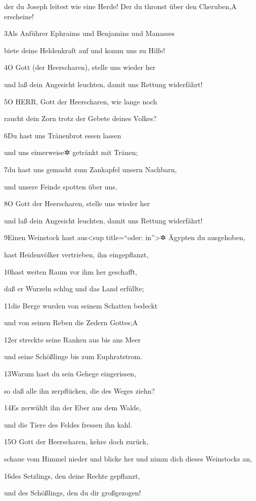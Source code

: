 der du Joseph leitest wie eine Herde! Der du thronst über den
Cheruben,{A} erscheine!

3Als Anführer Ephraims und Benjamins und Manasses

biete deine Heldenkraft auf und komm uns zu Hilfe!

4O Gott (der Heerscharen), stelle uns wieder her

und laß dein Angesicht leuchten, damit uns Rettung widerfährt!

5O HERR, Gott der Heerscharen, wie lange noch

raucht dein Zorn trotz der Gebete deines Volkes?

6Du hast uns Tränenbrot essen lassen

und uns eimerweise✲ getränkt mit Tränen;

7du hast uns gemacht zum Zankapfel unsern Nachbarn,

und unsere Feinde spotten über uns.

8O Gott der Heerscharen, stelle uns wieder her

und laß dein Angesicht leuchten, damit uns Rettung widerfährt!

9Einen Weinstock hast aus\textless sup title=``oder: in''\textgreater✲
Ägypten du ausgehoben,

hast Heidenvölker vertrieben, ihn eingepflanzt,

10hast weiten Raum vor ihm her geschafft,

daß er Wurzeln schlug und das Land erfüllte;

11die Berge wurden von seinem Schatten bedeckt

und von seinen Reben die Zedern Gottes;{A}

12er streckte seine Ranken aus bis ans Meer

und seine Schößlinge bis zum Euphratstrom.

13Warum hast du sein Gehege eingerissen,

so daß alle ihn zerpflücken, die des Weges ziehn?

14Es zerwühlt ihn der Eber aus dem Walde,

und die Tiere des Feldes fressen ihn kahl.

15O Gott der Heerscharen, kehre doch zurück,

schaue vom Himmel nieder und blicke her und nimm dich dieses Weinstocks
an,

16des Setzlings, den deine Rechte gepflanzt,

und des Schößlings, den du dir großgezogen!

